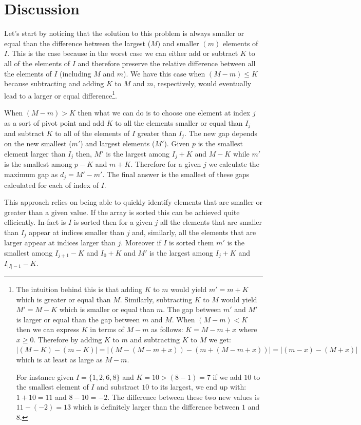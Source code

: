 \section{Discussion}
\label{smallest_range:sec:discussion}
Let's start by noticing that the solution to this problem is always smaller or equal 
than the difference between the largest ($M)$ and smaller  $(m)$ elements of $I$.
This is the case because in the worst case we can either add or subtract $K$ to all of the elements of $I$
and therefore preserve the relative difference between all the elements of $I$ (including $M$ and $m$).
We have this case when $(M-m) \leq K$ because subtracting and adding $K$ to $M$ and $m$, respectively, would
eventually lead to a larger or equal difference\footnote{The intuition behind this is that 
adding $K$ to $m$ would yield $m' = m+K$ which is greater or equal than $M$.
Similarly, subtracting $K$ to $M$ would yield $M' = M-K$ which is smaller or equal than $m$.
The gap between $m'$ and $M'$ is larger or equal than the gap between $m$ and $M$. 
When $(M-m) < K$ then we can express $K$ in terms of $M-m$ as follows: $K = M-m + x$ where $x \geq 0$.
Therefore by adding $K$ to $m$ and subtracting $K$ to $M$ we get:
$|(M-K) - (m-K)| = |(M-(M-m + x)) - (m + (M-m + x))| = |(m-x) - (M+x)|$
which is at least as large as $M-m$.

For instance given $I = \{1,2,6,8\}$ and $K = 10 > (8-1) = 7$ if we add $10$ to the smallest element of $I$ and substract $10$ to its largest,
we end up with: $1+10 = 11$ and $8-10=-2$. The difference between these two new values is $11-(-2) = 13$ which is definitely larger than the difference between $1$ and $8$.
}.

When $(M-m) > K$ then what we can do is to choose one element at index $j$ as a sort of pivot point and 
add $K$ to all the elements smaller or equal than $I_j$ and subtract $K$ to all of the elements of $I$ greater than $I_j$.
The new gap depends on the new smallest ($m'$) and largest elements ($M'$).
Given $p$ is the smallest element larger than $I_j$ then,
$M'$ is the largest among $I_j+K$ and $M-K$ while $m'$ is the smallest among $p - K$ and $m+K$.
Therefore for a given $j$ we calculate the maximum gap as $d_j = M'-m'$.
The final answer is the smallest of these gaps calculated for each of index of $I$.

This approach relies on being able to quickly identify elements
that are smaller or greater than a given value. 
If the array is sorted this can be achieved quite efficiently.
In-fact is $I$ is sorted then for a given $j$ all the elements that are smaller than $I_j$ appear at indices smaller than $j$ and, similarly,
all the elements that are larger appear at indices larger than $j$. 
Moreover if $I$ is sorted them $m'$ is the smallest among $I_{j+1}-K$ and $I_0 +K$
and $M'$ is the largest among $I_j+K$ and $I_{|I|-1}-K$.

